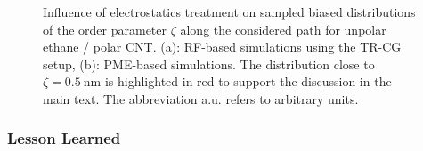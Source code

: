 \documentclass[9pt,lessons]{livecoms}
\begin{document}
\begin{figure}[htb!]
  \centering    
  \caption{
  Influence of electrostatics treatment on sampled biased distributions of the order parameter $\zeta$ along the considered path for unpolar ethane / polar CNT. 
  (a): RF-based simulations using the TR-CG setup, (b): PME-based simulations. The distribution close to $\zeta =0.5~\mathrm{nm}$ is highlighted in red to support the discussion in the main text. 
  The abbreviation a.u. refers to arbitrary units.
}  
\label{fig:polCNT_unpLig_estimator_distrib}
\end{figure}


\subsubsection*{Lesson Learned}
\end{document}
